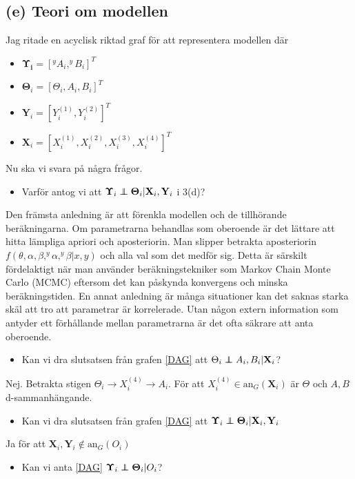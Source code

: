 \documentclass{assignment}
\begin{document}
\subsection*{(e) Teori om modellen}
Jag ritade en acyclisk riktad graf för att representera modellen där 
\begin{itemize}
    \item $\mathbf{\Upsilon_i} = [^y A_i, ^y B_i]^T$
    \item $\mathbf{\Theta}_i = [\Theta_i, A_i, B_i]^T$
    \item $\mathbf{Y}_i = [Y_i^{(1)},Y_i^{(2)}]^T$ 
    \item $\mathbf{X}_i = [X_i^{(1)},X_i^{(2)},X_i^{(3)},X_i^{(4)}]^T$ 
\end{itemize}
Nu ska vi svara på några frågor.
\begin{itemize}
    \item Varför antog vi att $\mathbf{\Upsilon}_i \perp\!\!\!\!\perp \mathbf{\Theta}_i | \mathbf{X}_i,\mathbf{Y}_i$ i 3(d)?
\end{itemize}
Den främsta anledning är att förenkla modellen och de tillhörande beräkningarna. 
Om parametrarna behandlas som oberoende är det lättare att hitta lämpliga apriori och aposteriorin.  
Man slipper betrakta aposteriorin $f(\theta,\alpha,\beta,^y\alpha,^y\beta|x,y)$ och alla val som det medför sig.
Detta är särskilt fördelaktigt när man använder beräkningstekniker som Markov Chain Monte Carlo (MCMC) 
eftersom det kan påskynda konvergens och minska beräkningstiden.
En annat anledning är många situationer kan det saknas starka skäl att tro att parametrar är korrelerade. 
Utan någon extern information som antyder ett förhållande mellan parametrarna är det ofta säkrare att anta oberoende.
\begin{itemize}
    \item Kan vi dra slutsatsen från grafen \cref{DAG} att $\Theta_i \perp\!\!\!\!\perp A_i,B_i | \mathbf{X}_i$?
\end{itemize}
Nej. Betrakta stigen $\Theta_i \rightarrow X^{(4)}_i \rightarrow A_i$. 
För att $X^{(4)}_i \in \text{an}_G(\mathbf{X}_i)$ är $\Theta$ och $A, B$ d-sammanhängande.
\begin{itemize}
    \item Kan vi dra slutsatsen från grafen \cref{DAG} att $\mathbf{\Upsilon}_i \perp\!\!\!\!\perp \mathbf{\Theta}_i | \mathbf{X}_i,\mathbf{Y}_i$
\end{itemize}
Ja för att $\mathbf{X}_i, \mathbf{Y}_i \notin \text{an}_G(O_i)$
\begin{itemize}
    \item Kan vi anta \cref{DAG} $\mathbf{\Upsilon}_i \perp\!\!\!\!\perp \mathbf{\Theta}_i | O_i$?
\end{itemize}
\end{document}
